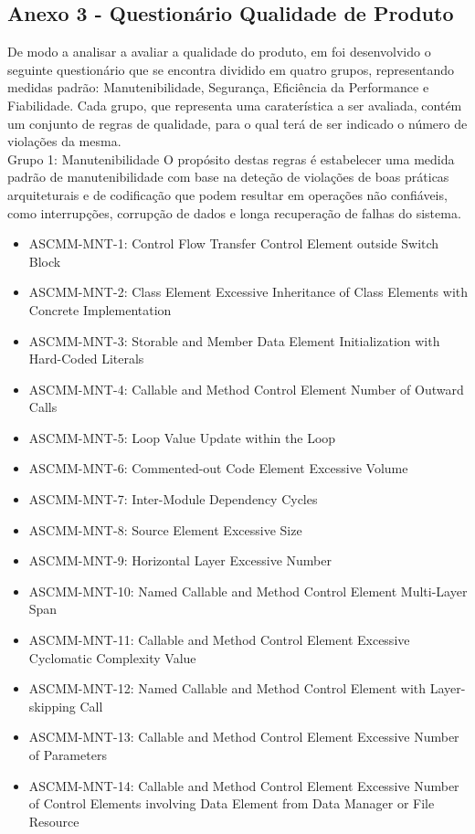 \documentclass[openany,10pt,a4paper]{article}
\begin{document}
\begin{appendix}
\subsection{Anexo 3 - Questionário Qualidade de Produto}
\label{anexo_produto}
De modo a analisar a avaliar a qualidade do produto, em foi desenvolvido o seguinte questionário que se encontra dividido em quatro grupos, representando medidas padrão: Manutenibilidade, Segurança, Eficiência da Performance e Fiabilidade.
Cada grupo, que representa uma caraterística a ser avaliada, contém um conjunto de regras de qualidade, para o qual terá de ser indicado o número de violações da mesma.\\
Grupo 1: Manutenibilidade
O propósito destas regras é estabelecer uma medida padrão de manutenibilidade com base na deteção de violações de boas práticas arquiteturais e de codificação que podem resultar em operações não confiáveis, como interrupções, corrupção de dados e longa recuperação de falhas do sistema.
\begin{itemize}
	\setlength\itemsep{0em}
	\item ASCMM-MNT-1: Control Flow Transfer Control Element outside Switch Block
	\item ASCMM-MNT-2: Class Element Excessive Inheritance of Class Elements with Concrete Implementation
	\item ASCMM-MNT-3: Storable and Member Data Element Initialization with Hard-Coded Literals
	\item ASCMM-MNT-4: Callable and Method Control Element Number of Outward Calls
	\item ASCMM-MNT-5: Loop Value Update within the Loop
	\item ASCMM-MNT-6: Commented-out Code Element Excessive Volume
	\item ASCMM-MNT-7: Inter-Module Dependency Cycles
	\item ASCMM-MNT-8: Source Element Excessive Size
	\item ASCMM-MNT-9: Horizontal Layer Excessive Number
	\item ASCMM-MNT-10: Named Callable and Method Control Element Multi-Layer Span
	\item ASCMM-MNT-11: Callable and Method Control Element Excessive Cyclomatic Complexity Value
	\item ASCMM-MNT-12: Named Callable and Method Control Element with Layer-skipping Call
	\item ASCMM-MNT-13: Callable and Method Control Element Excessive Number of Parameters
	\item ASCMM-MNT-14: Callable and Method Control Element Excessive Number of Control Elements involving Data Element from Data Manager or File Resource

\end{itemize}
\end{appendix}
\end{document}
